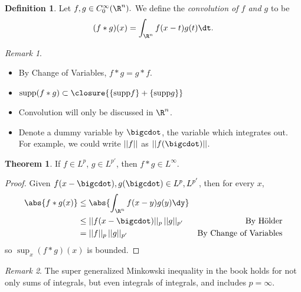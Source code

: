 \documentclass[a5paper]{article}
\theoremstyle{definition}%
\newtheorem{theorem}{Theorem}
\newtheorem*{definition*}{Definition}
\numberwithin{exercise}{section}
\theoremstyle{remark}%
\newtheorem*{remark*}{Remark}
\begin{document}
\begin{highlight}
\begin{definition*}
Let $f,g\in C_0^\infty(\R^n).$ We define the \emph{convolution of $f$ and $g$} to be
$$(f*g)(x) = \int_{\R^n} f(x-t)g(t)\dt.$$
\end{definition*}
\end{highlight}

\begin{remark*}\mbox{}
	\begin{itemize}
	\item By Change of Variables, $f*g=g*f$.
	\item $\supp (f*g) \subset \closure{\{\supp f\} + \{\supp g\}}$
	\item Convolution will only be discussed in $\R^n$. 
	\item Denote a dummy variable by $\bigcdot$, the variable which integrates out. For example, we could write $||f||$ as $\norm{f(\bigcdot)}$. 
	\end{itemize}
\end{remark*}


\pagebreak
\begin{highlight}
\begin{theorem}
If $f\in L^p$, $g\in L^{p'}$, then $f*g\in L^\infty$. 
\end{theorem}
\end{highlight}
\begin{proof}
Given $f(x-\bigcdot), g(\bigcdot) \in L^p, L^{p'}$, then for every $x$, 
\begin{align*}
\abs{f*g(x)}&\leq \abs{\int_{\R^n}f(x-y)g(y)\dy} \\
&\leq \norm{f(x-\bigcdot)}_{p} \, \norm{g}_{p'}& \text{By H\"older} \\
&= \norm{f}_{p} \, \norm{g}_{p'}& \text{By Change of Variables} 
\end{align*}
so $\sup_x(f*g)(x)$ is bounded.
\end{proof}

\begin{remark*}
The super generalized Minkowski inequality in the book holds for not only sums of integrals, but even integrals of integrals, and includes $p=\infty$. 
\end{remark*}
\end{document}
